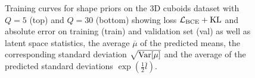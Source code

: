 \begin{figure}[h]
\begin{subfigure}[t]{0.48\textwidth}
  \end{subfigure}
  \caption{Training curves for \VAE shape priors on the 3D cuboids dataset
  with $Q = 5$ (top) and $Q = 30$ (bottom) showing loss
  $\mathcal{L}_{\text{BCE}} + \mathrm{KL}$ and absolute error \Abs on
  training (train) and validation set (val) as well as latent space statistics,
  \ie the average $\overline{\mu}$ of the predicted means, the corresponding
  standard deviation $\sqrt{\mathrm{Var}[\mu]}$ and the average of the predicted
  standard deviations $\exp(\frac{1}{2}\overline{l})$.}
  \label{fig:appendix-experiments-3d-vae-t}
\end{figure}
        
